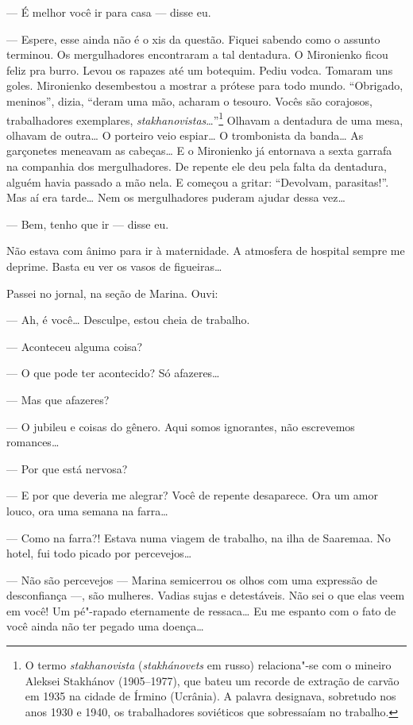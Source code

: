 --- É melhor você ir para casa --- disse eu.

--- Espere, esse ainda não é o xis da questão. Fiquei sabendo como o
assunto terminou. Os mergulhadores encontraram a tal dentadura. O
Mironienko ficou feliz pra burro. Levou os rapazes até um botequim.
Pediu vodca. Tomaram uns goles. Mironienko desembestou a mostrar a
prótese para todo mundo. ``Obrigado, meninos'', dizia, ``deram uma mão,
acharam o tesouro. Vocês são corajosos, trabalhadores exemplares,
\emph{stakhanovistas}\ldots{}''\footnote{O termo \emph{stakhanovista}
  (\emph{stakhánovets} em russo) relaciona"-se com o mineiro Aleksei
  Stakhánov (1905--1977), que bateu um recorde de extração de
  carvão em 1935 na cidade de Írmino (Ucrânia). A palavra designava,
  sobretudo nos anos 1930 e 1940, os trabalhadores soviéticos que
  sobressaíam no trabalho.} Olhavam a dentadura de uma mesa, olhavam de
outra\ldots{} O porteiro veio espiar\ldots{} O trombonista da banda\ldots{} As
garçonetes meneavam as cabeças\ldots{} E o Mironienko já entornava a sexta
garrafa na companhia dos mergulhadores. De repente ele deu pela falta da
dentadura, alguém havia passado a mão nela. E começou a gritar:
``Devolvam, parasitas!''. Mas aí era tarde\ldots{} Nem os mergulhadores
puderam ajudar dessa vez\ldots{}

--- Bem, tenho que ir --- disse eu.

Não estava com ânimo para ir à maternidade. A atmosfera de hospital
sempre me deprime. Basta eu ver os vasos de figueiras\ldots{}

Passei no jornal, na seção de Marina. Ouvi:

--- Ah, é você\ldots{} Desculpe, estou cheia de trabalho.

--- Aconteceu alguma coisa?

--- O que pode ter acontecido? Só afazeres\ldots{}

--- Mas que afazeres?

--- O jubileu e coisas do gênero. Aqui somos ignorantes, não escrevemos
romances\ldots{}

--- Por que está nervosa?

--- E por que deveria me alegrar? Você de repente desaparece. Ora um
amor louco, ora uma semana na farra\ldots{}

--- Como na farra?! Estava numa viagem de trabalho, na ilha de Saaremaa.
No hotel, fui todo picado por percevejos\ldots{}

--- Não são percevejos --- Marina semicerrou os olhos com uma expressão
de desconfiança ---, são mulheres. Vadias sujas e detestáveis. Não sei o
que elas veem em você! Um pé"-rapado eternamente de ressaca\ldots{} Eu me
espanto com o fato de você ainda não ter pegado uma doença\ldots{}

